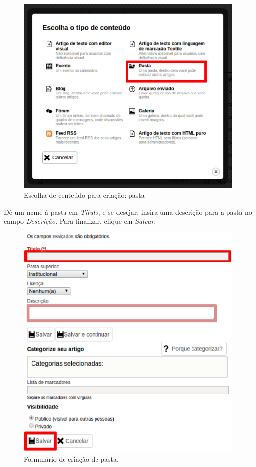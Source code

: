 \begin{figure}[H]
  \centering
    \includegraphics[keepaspectratio=true,scale=0.49]{figuras/escolhaConteudo.eps}
  \caption{Escolha de conteúdo para criação: pasta}
  \label{fig:selecionarConteudo}
\end{figure}

\newpage
Dê um nome à pasta em \emph{\color{red}Título}, e se desejar, insira uma descrição para a pasta no campo \emph{\color{pink}Descrição}. Para finalizar, clique em \emph{\color{red}Salvar}.

\begin{figure}[H]
  \centering
    \includegraphics[keepaspectratio=true,scale=0.49]{figuras/criandoPasta.eps}
  \caption{Formulário de criação de pasta.}
  \label{fig:FormCriacaoPasta}
\end{figure}

